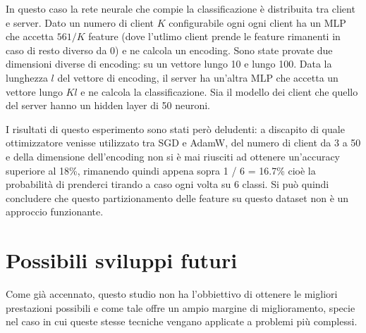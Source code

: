 In questo caso la rete neurale che compie la classificazione è 
distribuita tra client e server. Dato un numero di client \(K\) 
configurabile ogni ogni client ha un MLP che accetta \(561 / K\)
feature (dove l'utlimo client prende le feature rimanenti in caso di 
resto diverso da 0) e ne calcola un encoding. Sono state provate due 
dimensioni diverse di encoding: su un vettore lungo 10 e lungo 100.
Data la lunghezza \(l\) del vettore di encoding, il server ha un'altra 
MLP che accetta un vettore lungo \(Kl\) e ne calcola la classificazione.
Sia il modello dei client che quello del server hanno un hidden layer 
di 50 neuroni.

I risultati di questo esperimento sono stati però deludenti: a discapito
di quale ottimizzatore venisse utilizzato tra SGD e AdamW, del numero di client da 
3 a 50 e della dimensione dell'encoding non si è mai riusciti ad ottenere 
un'accuracy superiore al 18\%, rimanendo quindi appena sopra
1 / 6 = 16.7\% cioè la probabilità di prenderci tirando a caso ogni 
volta su 6 classi. Si può quindi concludere che questo partizionamento
delle feature su questo dataset non è un approccio funzionante.


\section{Possibili sviluppi futuri}
Come già accennato, questo studio non ha l'obbiettivo di ottenere le 
migliori prestazioni possibili e come tale offre un ampio margine di 
miglioramento, specie nel caso in cui queste stesse tecniche vengano 
applicate a problemi più complessi.  


